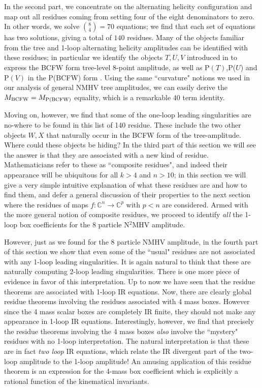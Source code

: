 \documentclass[12pt]{article}
\begin{document}
In the second part, we concentrate on the alternating helicity configuration and map out all residues coming from setting four of the eight denominators to zero. In other words, we solve ${8\choose 4 } = 70$ equations; we find that each set of equations has two solutions, giving a total of  $140$ residues. Many of the objects familiar from the tree and 1-loop alternating helicity amplitudes can be identified with these residues; in particular we identify the objects $T,U,V$ introduced in \cite{bcf} to express the BCFW form tree-level 8-point amplitude, as well as P$(T)$,P($U$) and P$(V)$ in the P(BCFW) form \cite{Hodges:2006tw}. Using the same ``curvature" notions we used in our analysis of general NMHV tree amplitudes, we can easily derive the $M_{{\rm BCFW}} = M_{{\rm P(BCFW)}}$ equality, which is a remarkable 40 term identity.

Moving on, however, we find that some of the one-loop leading singularities are no-where to be found in this list of 140 residue. These include the two other objects $W,X$ that naturally occur \cite{bcf} in the BCFW form of the tree-amplitude. Where could these objects be hiding? In the third part of this section we will see the answer is that they are associated with a new kind of residue. Mathematicians refer to these as  ``composite residues", and indeed their appearance will be ubiquitous for all $k>4$ and $n>10$; in this section we will give a very simple intuitive explanation of what these residues are and how to find them, and defer a general discussion of their properties to the next section where the residues of maps $f:\mathbb{C}^n\to \mathbb{C}^p$ with $p<n$ are considered. Armed with the more general notion of composite residues, we proceed to identify {\it all} the 1-loop box coefficients for the 8 particle N$^2$MHV amplitude.

However, just as we found for the 8 particle NMHV amplitude, in the fourth part of this section we show that even some of the ``usual" residues are not associated with any 1-loop leading singularities. It is again natural to think that these are naturally computing 2-loop leading singularities. There is one more piece of evidence in favor of this interpretation. Up to now we have seen that the residue theorems are associated with 1-loop IR equations. Now, there are clearly global residue theorems involving the residues associated with 4 mass boxes. However since the 4 mass scalar boxes are completely IR finite, they should not make any appearance in 1-loop IR equations. Interestingly, however, we find that precisely the residue theorems involving the 4 mass boxes {\it also} involve the ``mystery" residues with no 1-loop interpretation. The natural interpretation is that these are in fact {\it two loop} IR equations, which relate the IR divergent part of the two-loop amplitude to the 1-loop amplitude! An amusing application of this residue theorem is an expression for the 4-mass box coefficient which is explicitly a rational function of the kinematical invariants.
\end{document}
